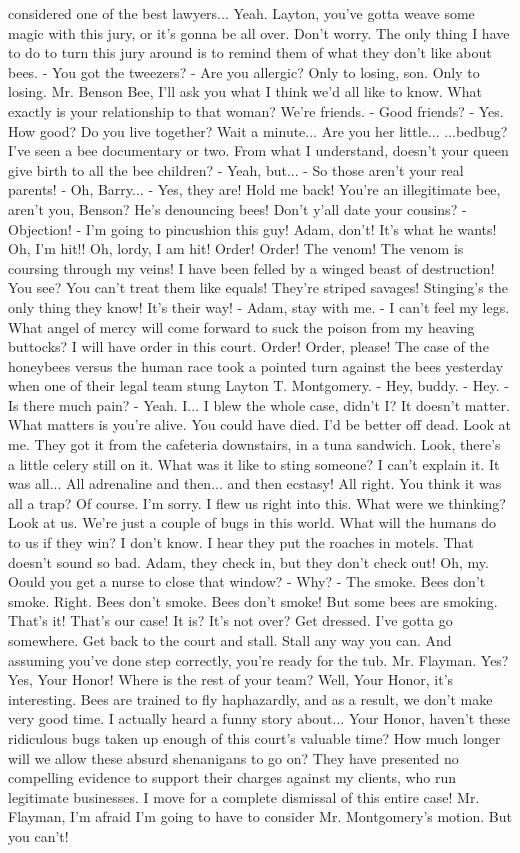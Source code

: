 \documentclass{article}
\begin{document}
considered one of the best lawyers... Yeah. Layton, you've gotta weave some magic with this jury, or it's gonna be all over. Don't worry. The only thing I have to do to turn this jury around is to remind them of what they don't like about bees. - You got the tweezers? - Are you allergic? Only to losing, son. Only to losing. Mr. Benson Bee, I'll ask you what I think we'd all like to know. What exactly is your relationship to that woman? We're friends. - Good friends? - Yes. How good? Do you live together? Wait a minute... Are you her little... ...bedbug? I've seen a bee documentary or two. From what I understand, doesn't your queen give birth to all the bee children? - Yeah, but... - So those aren't your real parents! - Oh, Barry... - Yes, they are! Hold me back! You're an illegitimate bee, aren't you, Benson? He's denouncing bees! Don't y'all date your cousins? - Objection! - I'm going to pincushion this guy! Adam, don't! It's what he wants! Oh, I'm hit!! Oh, lordy, I am hit! Order! Order! The venom! The venom is coursing through my veins! I have been felled by a winged beast of destruction! You see? You can't treat them like equals! They're striped savages! Stinging's the only thing they know! It's their way! - Adam, stay with me. - I can't feel my legs. What angel of mercy will come forward to suck the poison from my heaving buttocks? I will have order in this court. Order! Order, please! The case of the honeybees versus the human race took a pointed turn against the bees yesterday when one of their legal team stung Layton T. Montgomery. - Hey, buddy. - Hey. - Is there much pain? - Yeah. I... I blew the whole case, didn't I? It doesn't matter. What matters is you're alive. You could have died. I'd be better off dead. Look at me. They got it from the cafeteria downstairs, in a tuna sandwich. Look, there's a little celery still on it. What was it like to sting someone? I can't explain it. It was all... All adrenaline and then... and then ecstasy! All right. You think it was all a trap? Of course. I'm sorry. I flew us right into this. What were we thinking? Look at us. We're just a couple of bugs in this world. What will the humans do to us if they win? I don't know. I hear they put the roaches in motels. That doesn't sound so bad. Adam, they check in, but they don't check out! Oh, my. Oould you get a nurse to close that window? - Why? - The smoke. Bees don't smoke. Right. Bees don't smoke. Bees don't smoke! But some bees are smoking. That's it! That's our case! It is? It's not over? Get dressed. I've gotta go somewhere. Get back to the court and stall. Stall any way you can. And assuming you've done step correctly, you're ready for the tub. Mr. Flayman. Yes? Yes, Your Honor! Where is the rest of your team? Well, Your Honor, it's interesting. Bees are trained to fly haphazardly, and as a result, we don't make very good time. I actually heard a funny story about... Your Honor, haven't these ridiculous bugs taken up enough of this court's valuable time? How much longer will we allow these absurd shenanigans to go on? They have presented no compelling evidence to support their charges against my clients, who run legitimate businesses. I move for a complete dismissal of this entire case! Mr. Flayman, I'm afraid I'm going to have to consider Mr. Montgomery's motion. But you can't! 
\end{document}
